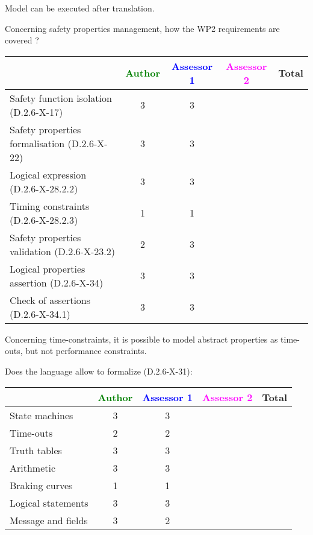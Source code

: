 \begin{author_comment}
Model can be executed after translation.
\end{author_comment}

Concerning safety properties management, how the WP2 requirements are covered ?

\begin{tabular}{|l | c | c | c | c|}
\hline
& \textcolor{green}{Author} & \textcolor{blue}{Assessor 1} & \textcolor{magenta}{Assessor 2} & Total \\
\hline 
Safety function isolation (D.2.6-X-17)  & 3 & 3 & &  \\
\hline 
Safety properties formalisation (D.2.6-X-22)  & 3 & 3 & &  \\
\hline
Logical expression (D.2.6-X-28.2.2)  & 3 & 3 & &  \\
\hline
Timing constraints (D.2.6-X-28.2.3)  & 1 & 1 & &  \\
\hline
Safety properties validation (D.2.6-X-23.2)  & 2 & 3 & &  \\
\hline
Logical properties assertion (D.2.6-X-34)  & 3 & 3 & &  \\
\hline
Check  of assertions (D.2.6-X-34.1)  & 3 & 3 & &  \\
\hline
\end{tabular}


\begin{author_comment}
Concerning time-constraints, it is possible to  model  abstract properties as time-outs, but not performance constraints.
\end{author_comment}


Does the language allow to  formalize (D.2.6-X-31):

\begin{tabular}{|l | c | c | c | c|}
\hline
& \textcolor{green}{Author} & \textcolor{blue}{Assessor 1} & \textcolor{magenta}{Assessor 2} & Total \\
\hline 
State machines  & 3 & 3 & &  \\
\hline
Time-outs  & 2 & 2 & &  \\
\hline
Truth tables  & 3 & 3 & &  \\
\hline
Arithmetic  & 3 & 3 & &  \\
\hline
Braking curves  & 1 & 1 & &  \\
\hline
Logical statements & 3 & 3 & &  \\
\hline
Message and fields & 3 & 2 & &  \\
\hline
\end{tabular}

